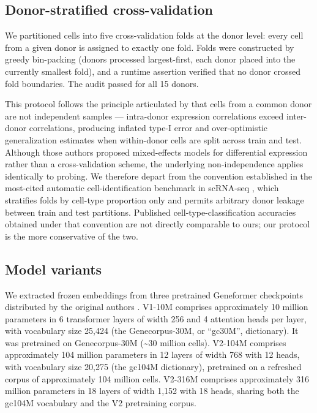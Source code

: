 \documentclass[
  11pt,
]{article}
\begin{document}
\subsection{Donor-stratified cross-validation}\label{donor-stratified-cross-validation}

We partitioned cells into five cross-validation folds at the donor
level: every cell from a given donor is assigned to exactly one fold.
Folds were constructed by greedy bin-packing (donors processed
largest-first, each donor placed into the currently smallest fold), and
a runtime assertion verified that no donor crossed fold boundaries. The
audit passed for all 15 donors.

This protocol follows the principle articulated by
\citet{zimmerman2021pseudoreplication} that cells from a common donor are not independent
samples --- intra-donor expression correlations exceed inter-donor
correlations, producing inflated type-I error and over-optimistic
generalization estimates when within-donor cells are split across train
and test. Although those authors proposed mixed-effects models for
differential expression rather than a cross-validation scheme, the
underlying non-independence applies identically to probing. We therefore
depart from the convention established in the most-cited automatic
cell-identification benchmark in scRNA-seq \citep{abdelaal2019},
which stratifies folds by cell-type proportion only and permits
arbitrary donor leakage between train and test partitions. Published
cell-type-classification accuracies obtained under that convention are
not directly comparable to ours; our protocol is the more conservative
of the two.

\subsection{Model variants}\label{model-variants}

We extracted frozen embeddings from three pretrained Geneformer
checkpoints distributed by the original authors \citep{theodoris2023}. V1-10M comprises
approximately 10 million parameters in 6 transformer layers of width 256
and 4 attention heads per layer, with vocabulary size 25,424 (the
Genecorpus-30M, or ``gc30M'', dictionary). It was pretrained on
Genecorpus-30M (\textasciitilde30 million cells). V2-104M comprises
approximately 104 million parameters in 12 layers of width 768 with 12
heads, with vocabulary size 20,275 (the gc104M dictionary), pretrained
on a refreshed corpus of approximately 104 million cells. V2-316M
comprises approximately 316 million parameters in 18 layers of width
1,152 with 18 heads, sharing both the gc104M vocabulary and the V2
pretraining corpus.
\end{document}
